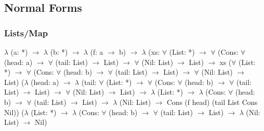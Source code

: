 \documentclass[11pt,oneside]{article}
\begin{document}
\vspace{1cm}
\subsection{Normal Forms}

\subsubsection*{Lists/Map}
{\selectfont
\vspace{0.5cm}
$\lambda$ (a: *) $\rightarrow$ $\lambda$ (b: *) $\rightarrow$ $\lambda$ (f: a $\rightarrow$ b) $\rightarrow$ $\lambda$ (xs: $\forall$ (List: *)
$\rightarrow$ $\forall$ (Cons: $\forall$ (head: a) $\rightarrow$ $\forall$ (tail: List) $\rightarrow$ List) $\rightarrow$ $\forall$ (Nil: List) $\rightarrow$ List)
$\rightarrow$ xs ($\forall$ (List: *) $\rightarrow$ $\forall$ (Cons: $\forall$ (head: b) $\rightarrow$ $\forall$ (tail: List) $\rightarrow$ List)
$\rightarrow$ $\forall$ (Nil: List) $\rightarrow$ List) ($\lambda$ (head: a) $\rightarrow$ $\lambda$ (tail: $\forall$ (List: *) $\rightarrow$
$\forall$ (Cons: $\forall$ (head: b) $\rightarrow$ $\forall$ (tail: List) $\rightarrow$ List) $\rightarrow$ $\forall$ (Nil: List)
$\rightarrow$ List) $\rightarrow$ $\lambda$ (List: *) $\rightarrow$ $\lambda$ (Cons: $\forall$ (head: b) $\rightarrow$ $\forall$
(tail: List) $\rightarrow$ List) $\rightarrow$ $\lambda$ (Nil: List) $\rightarrow$ Cons (f head) (tail List Cons Nil))
($\lambda$ (List: *) $\rightarrow$ $\lambda$ (Cons: $\forall$ (head: b) $\rightarrow$ $\forall$ (tail: List) $\rightarrow$
List) $\rightarrow$ $\lambda$ (Nil: List) $\rightarrow$ Nil)
}

\newpage
\end{document}
